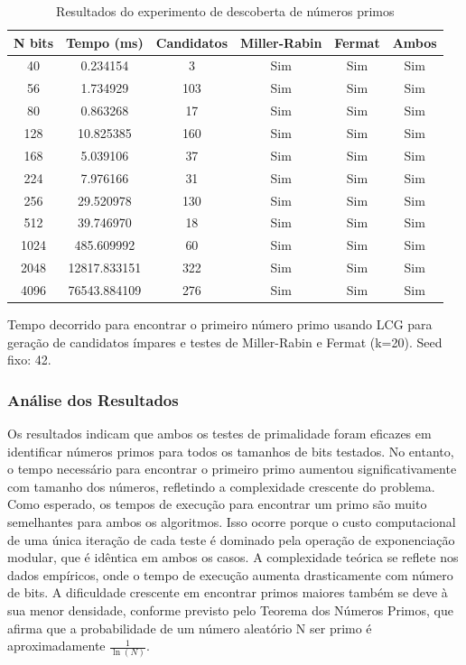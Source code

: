 \documentclass[a4paper, 11pt]{article}
\begin{document}
\begin{table}[h!]
    \centering
    \begin{threeparttable}
    \caption{Resultados do experimento de descoberta de números primos}
    \label{tab:prime_discovery}
    \begin{tabular}{|c|c|c|c|c|c|}
    \hline
    \textbf{N bits} & \textbf{Tempo (ms)} & \textbf{Candidatos} & \textbf{Miller-Rabin} &
    \textbf{Fermat} & \textbf{Ambos} \\
    \hline
    40 & 0.234154 & 3 & Sim & Sim & Sim \\
    \hline
    56 & 1.734929 & 103 & Sim & Sim & Sim \\
    \hline
    80 & 0.863268 & 17 & Sim & Sim & Sim \\
    \hline
    128 & 10.825385 & 160 & Sim & Sim & Sim \\
    \hline
    168 & 5.039106 & 37 & Sim & Sim & Sim \\
    \hline
    224 & 7.976166 & 31 & Sim & Sim & Sim \\
    \hline
    256 & 29.520978 & 130 & Sim & Sim & Sim \\
    \hline
    512 & 39.746970 & 18 & Sim & Sim & Sim \\
    \hline
    1024 & 485.609992 & 60 & Sim & Sim & Sim \\
    \hline
    2048 & 12817.833151 & 322 & Sim & Sim & Sim \\
    \hline
    4096 & 76543.884109 & 276 & Sim & Sim & Sim \\
    \hline
    \end{tabular}
    \begin{tablenotes}
    \small
    \item Tempo decorrido para encontrar o primeiro número primo usando LCG para geração de
    candidatos ímpares e testes de Miller-Rabin e Fermat (k=20). Seed fixo: 42.
    \end{tablenotes}
    \end{threeparttable}
    \end{table}
  

\subsubsection{Análise dos Resultados}
Os resultados indicam que ambos os testes de primalidade foram eficazes em identificar números primos para todos os tamanhos de bits testados. No entanto, o tempo necessário para encontrar o primeiro primo aumentou significativamente com tamanho dos números, refletindo a complexidade crescente do problema. Como esperado, os tempos de execução para encontrar um primo são muito semelhantes para ambos os algoritmos. Isso ocorre porque o custo computacional de uma única iteração de cada teste é dominado pela operação de exponenciação modular, que é idêntica em ambos os casos. A complexidade teórica se reflete nos dados empíricos, onde o tempo de execução aumenta drasticamente com número de bits. A dificuldade crescente em encontrar primos maiores também se deve à sua menor densidade, conforme previsto pelo Teorema dos Números Primos, que afirma que a probabilidade de um número aleatório N ser primo é aproximadamente $\frac{1}{\ln(N)}$. \parencite{wikipedia_numero_primo}
\end{document}
